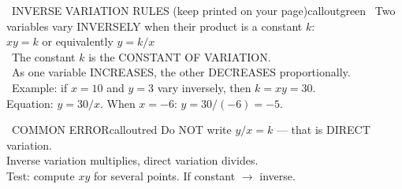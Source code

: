 \documentclass[11pt]{article}
\begin{document}

\begin{callout}{\IconBook\ INVERSE VARIATION RULES (keep printed on your page)}{calloutgreen}
\textbullet\ Two variables vary INVERSELY when their product is a constant \(k\):\\
\hspace*{1.6em}\(xy = k\) \hspace{1.4em} or equivalently \hspace{1.4em} \(y = k/x\)\\
\textbullet\ The constant \(k\) is the CONSTANT OF VARIATION.\\
\textbullet\ As one variable INCREASES, the other DECREASES proportionally.\\
\textbullet\ Example: if \(x = 10\) and \(y = 3\) vary inversely, then \(k = xy = 30\).\\
\hspace*{1.6em}Equation: \(y = 30/x\). When \(x = -6\): \(y = 30/(-6) = -5\).
\end{callout}

\begin{callout}{\IconWarn\ COMMON ERROR}{calloutred}
Do NOT write \(y/x = k\) --- that is DIRECT variation.\\
Inverse variation multiplies, direct variation divides.\\
Test: compute \(xy\) for several points. If constant \(\rightarrow\) inverse.
\end{callout}
\end{document}
